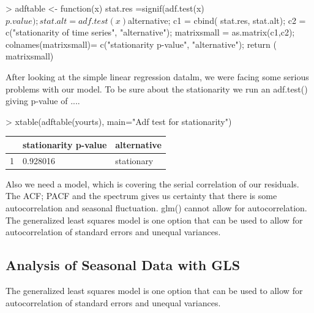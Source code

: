 \documentclass[11pt, a4paper]{article} %
\begin{document}
\begin{Schunk}
\begin{Sinput}
> adftable <- function(x) {
 stat.res =signif(adf.test(x)$p.value);
 stat.alt = adf.test(x)$alternative;
 c1 = cbind( stat.res, stat.alt);
 c2 = c("stationarity of time series",
         "alternative");
 matrixsmall = as.matrix(c1,c2);
 colnames(matrixsmall)= c("stationarity p-value",
         "alternative");
 return ( matrixsmall)
 }
\end{Sinput}
\end{Schunk}

After looking at the simple linear regression datalm, we were facing some serious problems with our model. To be sure about the stationarity we run an adf.test() giving p-value of .... 

\begin{Schunk}
\begin{Sinput}
> xtable(adftable(yourts), main="Adf test for stationarity")
\end{Sinput}
\begin{Soutput}
\begin{table}[ht]
\centering
\begin{tabular}{rll}
  \hline
 & stationarity p-value & alternative \\ 
  \hline
1 & 0.928016 & stationary \\ 
   \hline
\end{tabular}
\end{table}
\end{Soutput}
\end{Schunk}

Also we need a model, which is covering the serial correlation of our residuals. The ACF; PACF and the spectrum gives us certainty that there is some autocorrelation and seasonal fluctuation. glm() cannot allow for autocorrelation. The generalized least squares  model is one option that can be used to allow for autocorrelation of standard errors and unequal variances. 


\subsection{Analysis of Seasonal Data with GLS}

The generalized least squares  model is one option that can be used to allow for autocorrelation of standard errors and unequal variances. 
\linebreak
\end{document}
